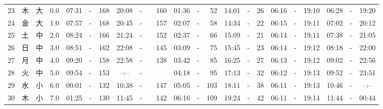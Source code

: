 \documentclass[12pt,a4j]{jsarticle}
\begin{document}
\begin{table}[htbp]
\begin{center}
{\begin{tabular}{|rc|cr|ccrccr|ccrccr|ccc|ccc|}
23 & 木 & 大 &  0.0 &  07:31 &-& 168 &  20:08 &-& 160 &  01:36 &-&  52 &  14:01 &-&  26 & 06:16 & -& 19:10 & 06:28 & -& 19:20 \\
24 & 金 & 大 &  1.0 &  07:57 &-& 168 &  20:45 &-& 157 &  02:07 &-&  58 &  14:34 &-&  22 & 06:15 & -& 19:11 & 07:02 & -& 20:12 \\
25 & 土 & 中 &  2.0 &  08:24 &-& 166 &  21:24 &-& 152 &  02:37 &-&  66 &  15:09 &-&  21 & 06:14 & -& 19:11 & 07:38 & -& 21:05 \\
26 & 日 & 中 &  3.0 &  08:51 &-& 162 &  22:08 &-& 145 &  03:09 &-&  75 &  15:45 &-&  23 & 06:14 & -& 19:12 & 08:18 & -& 22:00 \\
27 & 月 & 中 &  4.0 &  09:20 &-& 158 &  22:58 &-& 138 &  03:42 &-&  85 &  16:25 &-&  27 & 06:13 & -& 19:12 & 09:02 & -& 22:56 \\
28 & 火 & 中 &  5.0 &  09:54 &-& 153 &  --:-- &-&~~~~~ &  04:18 &-&  95 &  17:13 &-&  32 & 06:12 & -& 19:13 & 09:52 & -& 23:51 \\
29 & 水 & 小 &  6.0 &  00:01 &-& 132 &  10:38 &-& 147 &  05:05 &-& 103 &  18:11 &-&  38 & 06:11 & -& 19:13 & 10:46 & -& --:-- \\
30 & 木 & 小 &  7.0 &  01:25 &-& 130 &  11:45 &-& 142 &  06:16 &-& 109 &  19:24 &-&  42 & 06:11 & -& 19:14 & 11:44 & -& 00:44 \\
   \hline
   \end{tabular}}
   \end{center}
\end{table}
\newpage
\end{document}
